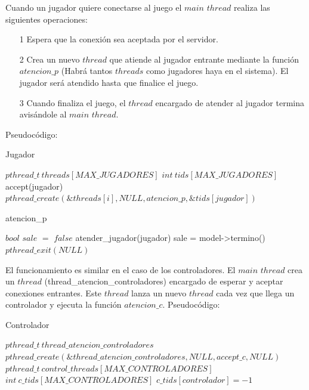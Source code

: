 Cuando un jugador quiere conectarse al juego el $main$ $thread$ realiza las siguientes operaciones:

\begin{itemize}
	\item[1] Espera que la conexión sea aceptada por el servidor.
	\item[2] Crea un nuevo $thread$ que atiende al jugador entrante mediante la función $atencion\_p$ (Habrá tantos $threads$ como jugadores haya en el sistema). El jugador será atendido hasta que finalice el juego.
	\item[3] Cuando finaliza el juego, el $thread$ encargado de atender al jugador termina avisándole al $main$ $thread$.
\end{itemize}

Pseudocódigo:

\begin{algorithm}[H]
\caption{Jugador}\label{ej1}
\begin{algorithmic}[1]
	\State $pthread\_t \ threads[MAX\_JUGADORES]$ 
	\State $int \ tids[MAX\_JUGADORES]$
		\State accept(jugador)
		\State $pthread\_create(\&threads[i],NULL,atencion\_p,\&tids[jugador])$
	\EndFor
\EndProcedure
\end{algorithmic}
\end{algorithm}

\begin{algorithm}[H]
\caption{atencion\_p}\label{ej1}
\begin{algorithmic}[1]
	\State $bool$ $sale$ $=$ $false$ 
		\State atender\_jugador(jugador)
		\State sale = model->termino()
	\EndWhile
	\State $pthread\_exit(NULL)$
\EndProcedure
\end{algorithmic}
\end{algorithm}

El funcionamiento es similar en el caso de los controladores. El $main$ $thread$ crea un $thread$ (thread\_atencion\_controladores) encargado de esperar y aceptar conexiones entrantes. Este $thread$ lanza un nuevo $thread$ cada vez que llega un controlador y ejecuta la función $atencion\_c$. Pseudocódigo:

\begin{algorithm}[H]
\caption{Controlador}\label{ej1}
\begin{algorithmic}[1]
	\State $pthread\_t  \ thread\_atencion\_controladores$
	\State $pthread\_create(\&thread\_atencion\_controladores,NULL,accept\_c,NULL)$
	\State $pthread\_t \ control\_threads[MAX\_CONTROLADORES]$
	\State $int \ c\_tids[MAX\_CONTROLADORES]$
		\State $c\_tids[controlador]= -1$
	\EndFor
\EndProcedure
\end{algorithmic}
\end{algorithm}

